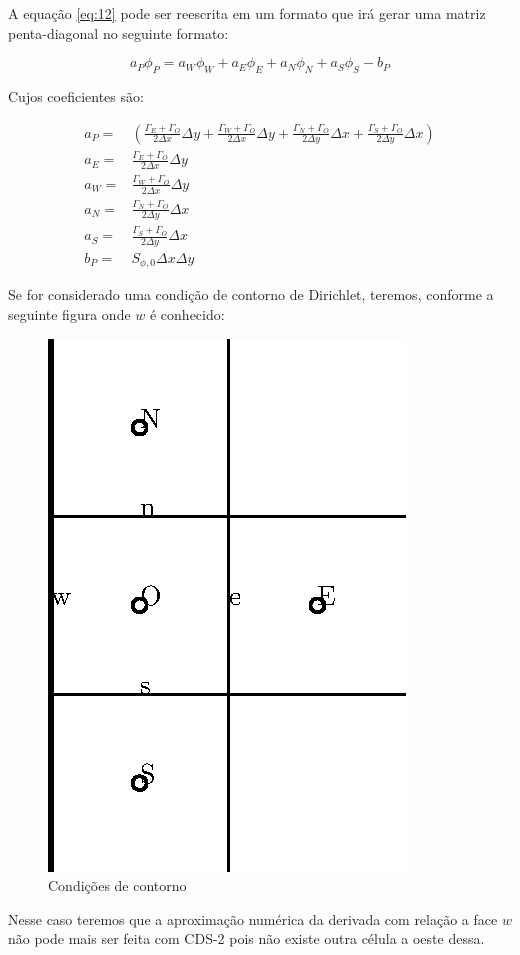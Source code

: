 A equação \ref{eq:12} pode ser reescrita em um formato que irá gerar uma matriz penta-diagonal no seguinte formato:

\begin{equation}
    a_P \phi_P = a_W \phi_W + a_E \phi_E + a_N \phi_N + a_S \phi_S - b_P
\end{equation}

Cujos coeficientes são:

\begin{eqnarray}
    a_P =& \left( \frac{\Gamma_E + \Gamma_O}{2 \Delta x} \Delta y + \frac{\Gamma_W + \Gamma_O}{2 \Delta x} \Delta y + \frac{\Gamma_N + \Gamma_O}{2 \Delta y} \Delta x + \frac{\Gamma_S + \Gamma_O}{2 \Delta y} \Delta x \right)\\
    a_E =& \frac{\Gamma_E + \Gamma_O}{2 \Delta x} \Delta y\\
    a_W =& \frac{\Gamma_W + \Gamma_O}{2 \Delta x} \Delta y\\
    a_N =& \frac{\Gamma_N + \Gamma_O}{2 \Delta y} \Delta x\\
    a_S =& \frac{\Gamma_S + \Gamma_O}{2 \Delta y} \Delta x\\
    b_P =& S_{\phi,0} \Delta x \Delta y
\end{eqnarray}

Se for considerado uma condição de contorno de Dirichlet, teremos, conforme a seguinte figura onde $w$ é conhecido:

\begin{figure}[h!]
    \centering
    \includegraphics[width=0.4\linewidth]{fig/figura2.eps}
    \caption{Condições de contorno}
    \label{fig:fig2}
\end{figure}

Nesse caso teremos que a aproximação numérica da derivada com relação a face $w$ não pode mais ser feita com CDS-2 pois não existe outra célula a oeste dessa.

